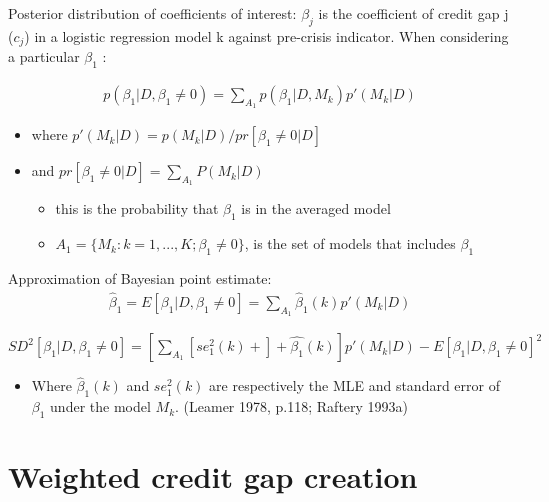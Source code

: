 \documentclass[
  ignorenonframetext,
]{beamer}
\providecommand{\tightlist}{%
  \setlength{\itemsep}{0pt}\setlength{\parskip}{0pt}}
\begin{document}
\begin{frame}{Posterior distribution of coefficients of interest:}
\protect\hypertarget{posterior-distribution-of-coefficients-of-interest}{}
\(\beta_j\) is the coefficient of credit gap j (\(c_j\)) in a logistic
regression model k against pre-crisis indicator. When considering a
particular \(\beta_1\) :

\begin{align*}
p(\beta_1|D, \beta_1\ne 0) = \sum\nolimits_{A_1} p(\beta_1|D,M_k)p'(M_k|D)
\end{align*}

\begin{itemize}
\tightlist
\item
  where \(p'(M_k|D)=p(M_k|D)/ pr[\beta_1 \ne 0|D]\)
\item
  and \(pr[\beta_1 \ne 0|D] = \sum\limits_{A_1} P(M_k|D)\)

  \begin{itemize}
  \tightlist
  \item
    this is the probability that \(\beta_1\) is in the averaged model
  \item
    \(A_1= \{M_k: k=1,...,K; \beta_1 \ne 0\}\), is the set of models
    that includes \(\beta_1\)
  \end{itemize}
\end{itemize}
\end{frame}

\begin{frame}{Approximation of Bayesian point estimate:}
\protect\hypertarget{approximation-of-bayesian-point-estimate}{}
\begin{align}
\hat{\beta}_1 = E[\beta_1|D, \beta_1\ne 0] = \sum\limits_{A_1} \hat{\beta}_1(k)p'(M_k|D)
\end{align}

\(SD^2[\beta_1|D, \beta_1\ne 0] =[\sum\limits_{A_1}[se_1^2(k)+]+\hat{\beta_1}(k)]p'(M_k|D) - E[\beta_1|D, \beta_1\ne 0]^2\)

\begin{itemize}
\tightlist
\item
  Where \(\hat{\beta}_1(k)\) and \(se_1^2(k)\) are respectively the MLE
  and standard error of \(\beta_1\) under the model \(M_k\). (Leamer
  1978, p.118; Raftery 1993a)
\end{itemize}
\end{frame}

\hypertarget{weighted-credit-gap-creation}{%
\section{Weighted credit gap
creation}\label{weighted-credit-gap-creation}}
\end{document}
